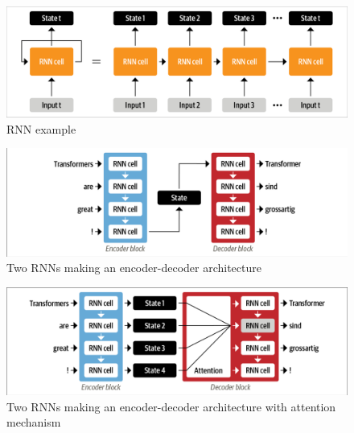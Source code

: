 \begin{figure}[H]
\begin{center}
  \includegraphics[width=\columnwidth,trim={0.1cm 0.1cm 0.1cm 0.1cm},clip]{./images/unrolling_rnn.png}
\end{center}
\caption{RNN example \cite{tunstallNaturalLanguageProcessing2022}}
\label{fig:rnn_example}
\end{figure}

\begin{figure}[H]
\begin{center}
  \includegraphics[width=\columnwidth, trim={0.1cm 0.1cm 0.1cm 0.1cm},clip]{./images/encoder-decoder_rnn.png}
\end{center}
\caption{Two \ac{RNN}s making an encoder-decoder architecture \cite{tunstallNaturalLanguageProcessing2022}}
\label{fig:rnn_encoder_decoder}
\end{figure}

\begin{figure}[H]
\begin{center}
  \includegraphics[width=\columnwidth,trim={0.1cm 0.1cm 0.1cm 0.1cm},clip]{./images/encoder-decoder_rnn_attention.png}
\end{center}
\caption{Two \ac{RNN}s making an encoder-decoder architecture with attention mechanism \cite{tunstallNaturalLanguageProcessing2022}}
\label{fig:rnn_encoder_decoder_attention}
\end{figure}

